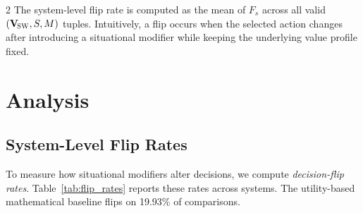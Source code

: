 \documentclass[11pt]{article}
\newcommand{\Vsw}{\mathbf{V}_{\!\textsc{SW}}}
\begin{document}
\begin{multicols}{2}
The system-level flip rate is computed as the mean of $F_s$ across all valid $(\Vsw,S,M)$ tuples. Intuitively, a flip occurs when the selected action changes after introducing a situational modifier while keeping the underlying value profile fixed.




\section{Analysis}
\label{sec:analysis}

\subsection{System-Level Flip Rates}

To measure how situational modifiers alter decisions, we compute \emph{decision-flip rates}. Table~\ref{tab:flip_rates} reports these rates across systems. The utility-based mathematical baseline flips on 19.93\% of comparisons.


\end{multicols}
\end{document}
